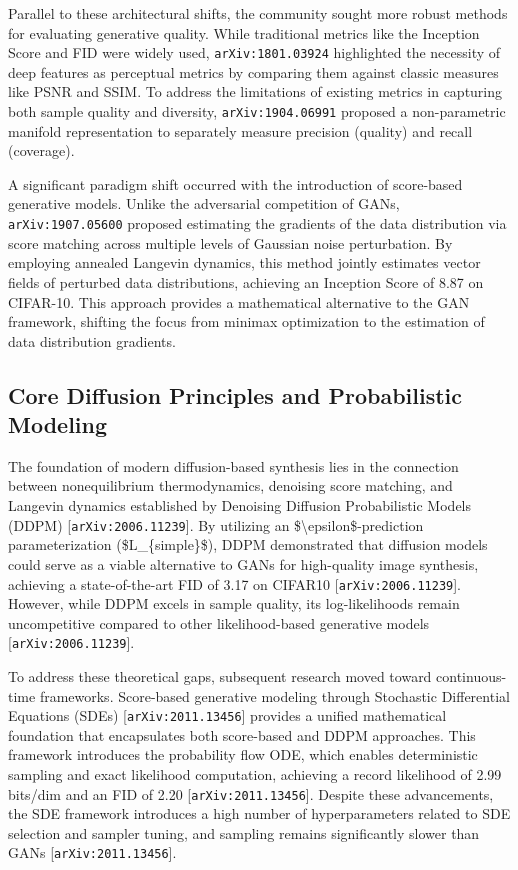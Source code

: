 \documentclass[11pt]{article}
\begin{document}
Parallel to these architectural shifts, the community sought more robust methods for evaluating generative quality. While traditional metrics like the Inception Score and FID were widely used, \texttt{arXiv:1801.03924} highlighted the necessity of deep features as perceptual metrics by comparing them against classic measures like PSNR and SSIM. To address the limitations of existing metrics in capturing both sample quality and diversity, \texttt{arXiv:1904.06991} proposed a non-parametric manifold representation to separately measure precision (quality) and recall (coverage).

A significant paradigm shift occurred with the introduction of score-based generative models. Unlike the adversarial competition of GANs, \texttt{arXiv:1907.05600} proposed estimating the gradients of the data distribution via score matching across multiple levels of Gaussian noise perturbation. By employing annealed Langevin dynamics, this method jointly estimates vector fields of perturbed data distributions, achieving an Inception Score of 8.87 on CIFAR-10. This approach provides a mathematical alternative to the GAN framework, shifting the focus from minimax optimization to the estimation of data distribution gradients.

\subsection{Core Diffusion Principles and Probabilistic Modeling}

The foundation of modern diffusion-based synthesis lies in the connection between nonequilibrium thermodynamics, denoising score matching, and Langevin dynamics established by Denoising Diffusion Probabilistic Models (DDPM) [\texttt{arXiv:2006.11239}]. By utilizing an \$\textbackslash{}epsilon\$-prediction parameterization (\$L\_\{simple\}\$), DDPM demonstrated that diffusion models could serve as a viable alternative to GANs for high-quality image synthesis, achieving a state-of-the-art FID of 3.17 on CIFAR10 [\texttt{arXiv:2006.11239}]. However, while DDPM excels in sample quality, its log-likelihoods remain uncompetitive compared to other likelihood-based generative models [\texttt{arXiv:2006.11239}].

To address these theoretical gaps, subsequent research moved toward continuous-time frameworks. Score-based generative modeling through Stochastic Differential Equations (SDEs) [\texttt{arXiv:2011.13456}] provides a unified mathematical foundation that encapsulates both score-based and DDPM approaches. This framework introduces the probability flow ODE, which enables deterministic sampling and exact likelihood computation, achieving a record likelihood of 2.99 bits/dim and an FID of 2.20 [\texttt{arXiv:2011.13456}]. Despite these advancements, the SDE framework introduces a high number of hyperparameters related to SDE selection and sampler tuning, and sampling remains significantly slower than GANs [\texttt{arXiv:2011.13456}].
\end{document}
